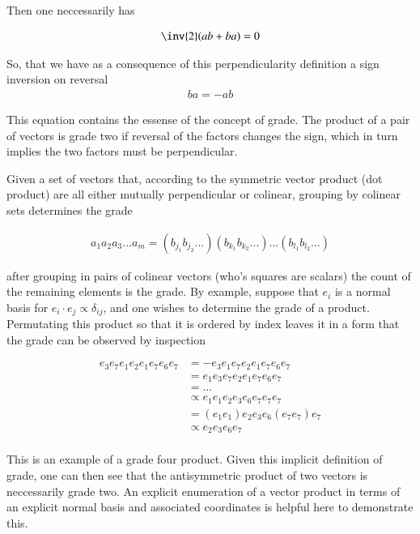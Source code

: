 \documentclass{article}
\begin{document}
Then one neccessarily has

\begin{align*}
\inv{2}(ab + ba) = 0 
\end{align*}

So, that we have as a consequence of this perpendicularity definition a sign inversion on reversal
\begin{align*}
ba = -ab
\end{align*}

This equation contains the essense of the concept of grade.  The product of a pair of vectors is grade two
if reversal of the factors changes the sign, which in turn implies the two factors must be perpendicular.

Given a set of vectors that, according to the symmetric vector product (dot product) are all either mutually perpendicular or colinear, grouping by colinear sets determines the grade

\begin{align*}
a_1 a_2 a_3 ... a_m = (b_{j_1} b_{j_2} ... ) (b_{k_1} b_{k_2} ... ) ...  (b_{l_1} b_{l_2} ... )
\end{align*}

after grouping in pairs of colinear vectors (who's squares are scalars) the count of the remaining elements is the grade.  By  
example, suppose that ${e_i}$ is a normal basis for  $e_i \cdot e_j \propto \delta_{ij}$, and one wishes to determine the grade
of a product.  Permutating this product so that it is ordered by index leaves it in a form that the grade can be observed by inspection

\begin{align*}
e_3 e_7 e_1 e_2 e_1 e_7 e_6 e_7 
&= - e_3 e_1 e_7 e_2 e_1 e_7 e_6 e_7 \\
&= e_1 e_3 e_7 e_2 e_1 e_7 e_6 e_7 \\
&= ... \\
&\propto e_1 e_1 e_2 e_3 e_6 e_7 e_7 e_7 \\
&= (e_1 e_1) e_2 e_3 e_6 (e_7 e_7) e_7 \\
&\propto e_2 e_3 e_6 e_7 \\
\end{align*}

This is an example of a grade four product.  Given this implicit definition of grade, one can then see that the antisymmetric product of
two vectors is neccessarily grade two.  An explicit enumeration of a vector product in terms of an explicit normal basis and associated 
coordinates is helpful here to demonstrate this.
\end{document}
